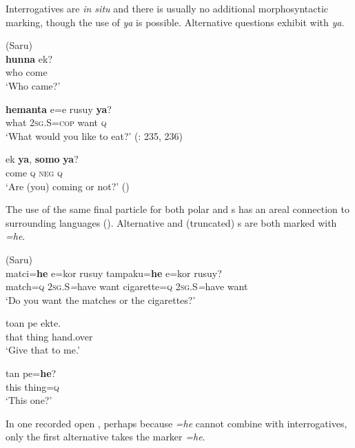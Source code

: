 \noindent Interrogatives are \textit{in situ} and there is usually no additional morphosyntactic marking, though the use of \textit{ya} is possible. Alternative questions exhibit  with \textit{ya}.

\ea%
    \label{ex:ainu:4}
     (Saru)\\
    \ea
    \gll \textbf{{hunna} } ek?\\
    who     come\\
    \glt ‘Who came?’

    \ex
    \gll \textbf{{hemanta}} e=e    rusuy \textbf{{ya}}?\\
    what    2\textsc{sg}.S=\textsc{cop}  want  \textsc{q}\\
    \glt ‘What would you like to eat?’ (\citealt{Tamura2000}: 235, 236)

    \ex
    \gll ek \textbf{{ya}}, \textbf{{somo}} \textbf{{ya}}?\\
    come  \textsc{q}  \textsc{neg}  \textsc{q}\\
    \glt ‘Are (you) coming or not?’ (\citealt{NINJAL2015})
    \z
    \z 

\noindent The use of the same final particle for both polar and s has an areal connection to surrounding languages (). Alternative and (truncated) s are both marked with \textit{=he}.

\ea%
    \label{ex:ainu:5}
     (Saru)\\
    \gll matci=\textbf{{he}} e=kor    rusuy  tampaku=\textbf{{he}} e=kor    rusuy?\\
    match=\textsc{q}  2\textsc{sg}.S\textit{=}have  want  cigarette=\textsc{q}  2\textsc{sg}.S\textit{=}have  want\\
    \glt ‘Do you want the matches or the cigarettes?’ \citep[234]{Tamura2000}
    \z

\ea%
    \label{ex:ainu:6}
    \ea
    \gll toan  pe  ekte.\\
    that  thing  hand.over\\
    \glt ‘Give that to me.’

    \ex
    \gll tan  pe=\textbf{{he}}?\\
    this  thing=\textsc{q}\\
    \glt ‘This one?’ \citep[234]{Tamura2000}
    \z
    \z

\noindent In one recorded open , perhaps because \textit{=he} cannot combine with interrogatives, only the first alternative takes the marker \textit{=he}.

